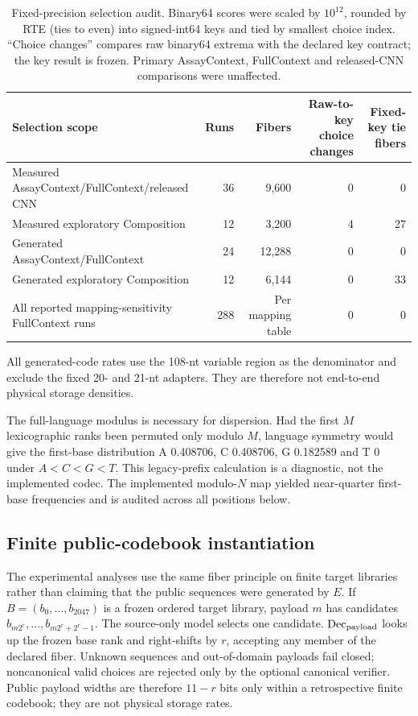 \documentclass[10pt]{article}
\begin{document}
\begin{table}[H]
\centering
\scriptsize
\begin{tabular}{lrrrr}
\toprule
Selection scope & Runs & Fibers & Raw-to-key choice changes & Fixed-key tie fibers\\
\midrule
Measured AssayContext/FullContext/released CNN & 36 & 9,600 & 0 & 0\\
Measured exploratory Composition & 12 & 3,200 & 4 & 27\\
Generated AssayContext/FullContext & 24 & 12,288 & 0 & 0\\
Generated exploratory Composition & 12 & 6,144 & 0 & 33\\
All reported mapping-sensitivity FullContext runs & 288 & Per mapping table & 0 & 0\\
\bottomrule
\end{tabular}
\caption{Fixed-precision selection audit. Binary64 scores were scaled by $10^{12}$, rounded by RTE (ties to even) into signed-int64 keys and tied by smallest choice index. ``Choice changes'' compares raw binary64 extrema with the declared key contract; the key result is frozen. Primary AssayContext, FullContext and released-CNN comparisons were unaffected.}
\label{tab:s-score-determinism}
\end{table}

All generated-code rates use the 108-nt variable region as the denominator and exclude the fixed 20- and 21-nt adapters. They are therefore not end-to-end physical storage densities.

The full-language modulus is necessary for dispersion. Had the first $M$ lexicographic ranks been permuted only modulo $M$, language symmetry would give the first-base distribution A 0.408706, C 0.408706, G 0.182589 and T 0 under $A<C<G<T$. This legacy-prefix calculation is a diagnostic, not the implemented codec. The implemented modulo-$N$ map yielded near-quarter first-base frequencies and is audited across all positions below.

\subsection{Finite public-codebook instantiation}

The experimental analyses use the same fiber principle on finite target libraries rather than claiming that the public sequences were generated by $E$. If $B=(b_0,\ldots,b_{2047})$ is a frozen ordered target library, payload $m$ has candidates $b_{m2^r},\ldots,b_{m2^r+2^r-1}$. The source-only model selects one candidate. $\operatorname{Dec}_{\rm payload}$ looks up the frozen base rank and right-shifts by $r$, accepting any member of the declared fiber. Unknown sequences and out-of-domain payloads fail closed; noncanonical valid choices are rejected only by the optional canonical verifier. Public payload widths are therefore $11-r$ bits only within a retrospective finite codebook; they are not physical storage rates.
\end{document}
